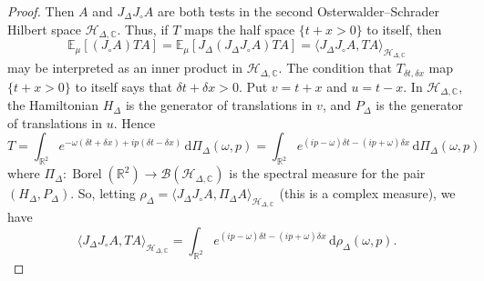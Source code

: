 \documentclass[11pt, letterpaper, reqno]{amsart}
\theoremstyle{definition}
\theoremstyle{remark}
\newcommand{\bbC}{\mathbb{C}}
\newcommand{\bbE}{\mathbb{E}}
\newcommand{\bbR}{\mathbb{R}}
\newcommand{\calB}{\mathcal{B}}
\newcommand{\calH}{\mathcal{H}}
\newcommand{\dd}{\,\mathrm{d}}
\begin{document}
\begin{proof}
    Then $A$ and $J_\Delta J_\circ A$ are both tests in the  second Osterwalder--Schrader Hilbert space $\calH_{\Delta,\bbC}$. Thus, if $T$ maps the half space $\{t+x>0\}$ to itself, then
    \begin{equation}
        \bbE_\mu[(J_\circ A)T A ] =\bbE_\mu[J_\Delta (J_\Delta J_\circ A)T A ] = \langle J_\Delta J_\circ A,TA \rangle_{\calH_{\Delta,\bbC}}
    \end{equation}
    may be interpreted as an inner product in $\calH_{\Delta,\bbC}$. 
    The condition that $T_{\delta t,\delta x}$ map $\{t+x>0\}$ to itself says that $\delta t+\delta x>0$. Put $v=t+x$ and $u=t-x$. 
    In $\calH_{\Delta,\bbC}$, the Hamiltonian $H_\Delta$ is the generator of translations in $v$, and $P_\Delta$ is the generator of translations in $u$. Hence 
    \begin{equation}
        T = \int_{\bbR^2} e^{- \omega (\delta t+\delta x) + i p (\delta t-\delta x)} \dd \Pi_\Delta(\omega,p) = \int_{\bbR^2} e^{ (ip-\omega) \delta t - (ip+\omega) \delta x} \dd \Pi_\Delta(\omega ,p) 
    \end{equation}
    where $\Pi_\Delta:\operatorname{Borel}(\bbR^2)\to \calB(\calH_{\Delta,\bbC})$ is the spectral measure for the pair $(H_\Delta,P_\Delta)$. So, letting $\rho_\Delta = \langle J_\Delta J_\circ A, \Pi_\Delta A \rangle_{\calH_{\Delta,\bbC}}$
    (this is a complex measure), we have 
    \begin{equation}
        \langle J_\Delta J_\circ A,TA \rangle_{\calH_{\Delta,\bbC}} = \int_{\bbR^2} e^{(ip-\omega) \delta t - (ip+\omega) \delta x} \dd \rho_\Delta(\omega,p)  .
    \end{equation}


\end{proof}
\end{document}
